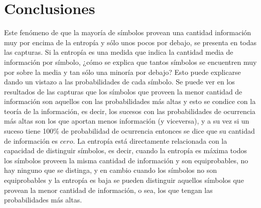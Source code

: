 \section{Conclusiones}

Este fenómeno de que la mayoría de símbolos provean una cantidad información muy por encima de la entropía y sólo unos pocos por debajo, se presenta en todas las capturas. Si la entropía es una medida que indica la cantidad media de información por símbolo, ¿cómo se explica que tantos símbolos se encuentren muy por sobre la media y tan sólo una minoría por debajo? Esto puede explicarse dando un vistazo a las probabilidades de cada símbolo. Se puede ver en los resultados de las capturas que los símbolos que proveen la menor cantidad de información son aquellos con las probabilidades más altas y esto se condice con la teoría de la información, es decir, los sucesos con las probabilidades de ocurrencia más altas son los que aportan menos información (y viceversa), y a su vez si un suceso tiene 100\% de probabilidad de ocurrencia entonces se dice que su cantidad de información es $cero$. La entropía está directamente relacionada con la capacidad de distinguir símbolos, es decir, cuando la entropía es máxima todos los símbolos proveen la misma cantidad de información y son equiprobables, no hay ninguno que se distinga, y en cambio cuando los símbolos no son equiprobables y la entropía es baja se pueden distinguir aquellos símbolos que provean la menor cantidad de información, o sea, los que tengan las probabilidades más altas.